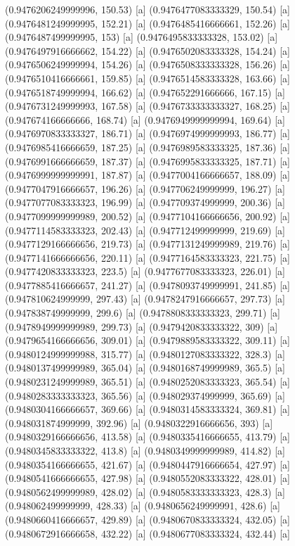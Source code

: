 {{{(0.9476206249999996, 150.53) [a] 
(0.9476477083333329, 150.54) [a] 
(0.9476481249999995, 152.21) [a] 
(0.9476485416666661, 152.26) [a] 
(0.9476487499999995, 153) [a] 
(0.9476495833333328, 153.02) [a] 
(0.9476497916666662, 154.22) [a] 
(0.9476502083333328, 154.24) [a] 
(0.9476506249999994, 154.26) [a] 
(0.9476508333333328, 156.26) [a] 
(0.9476510416666661, 159.85) [a] 
(0.9476514583333328, 163.66) [a] 
(0.9476518749999994, 166.62) [a] 
(0.947652291666666, 167.15) [a] 
(0.9476731249999993, 167.58) [a] 
(0.9476733333333327, 168.25) [a] 
(0.947674166666666, 168.74) [a] 
(0.9476949999999994, 169.64) [a] 
(0.9476970833333327, 186.71) [a] 
(0.9476974999999993, 186.77) [a] 
(0.9476985416666659, 187.25) [a] 
(0.9476989583333325, 187.36) [a] 
(0.9476991666666659, 187.37) [a] 
(0.9476995833333325, 187.71) [a] 
(0.9476999999999991, 187.87) [a] 
(0.9477004166666657, 188.09) [a] 
(0.9477047916666657, 196.26) [a] 
(0.947706249999999, 196.27) [a] 
(0.9477077083333323, 196.99) [a] 
(0.947709374999999, 200.36) [a] 
(0.9477099999999989, 200.52) [a] 
(0.9477104166666656, 200.92) [a] 
(0.9477114583333323, 202.43) [a] 
(0.947712499999999, 219.69) [a] 
(0.9477129166666656, 219.73) [a] 
(0.9477131249999989, 219.76) [a] 
(0.9477141666666656, 220.11) [a] 
(0.9477164583333323, 221.75) [a] 
(0.9477420833333323, 223.5) [a] 
(0.9477677083333323, 226.01) [a] 
(0.9477885416666657, 241.27) [a] 
(0.9478093749999991, 241.85) [a] 
(0.947810624999999, 297.43) [a] 
(0.9478247916666657, 297.73) [a] 
(0.947838749999999, 299.6) [a] 
(0.9478808333333323, 299.71) [a] 
(0.9478949999999989, 299.73) [a] 
(0.9479420833333322, 309) [a] 
(0.9479654166666656, 309.01) [a] 
(0.9479889583333322, 309.11) [a] 
(0.9480124999999988, 315.77) [a] 
(0.9480127083333322, 328.3) [a] 
(0.9480137499999989, 365.04) [a] 
(0.9480168749999989, 365.5) [a] 
(0.9480231249999989, 365.51) [a] 
(0.9480252083333323, 365.54) [a] 
(0.9480283333333323, 365.56) [a] 
(0.948029374999999, 365.69) [a] 
(0.9480304166666657, 369.66) [a] 
(0.9480314583333324, 369.81) [a] 
(0.948031874999999, 392.96) [a] 
(0.9480322916666656, 393) [a] 
(0.9480329166666656, 413.58) [a] 
(0.9480335416666655, 413.79) [a] 
(0.9480345833333322, 413.8) [a] 
(0.9480349999999989, 414.82) [a] 
(0.9480354166666655, 421.67) [a] 
(0.9480447916666654, 427.97) [a] 
(0.9480541666666655, 427.98) [a] 
(0.9480552083333322, 428.01) [a] 
(0.9480562499999989, 428.02) [a] 
(0.9480583333333323, 428.3) [a] 
(0.948062499999999, 428.33) [a] 
(0.9480656249999991, 428.6) [a] 
(0.9480660416666657, 429.89) [a] 
(0.9480670833333324, 432.05) [a] 
(0.9480672916666658, 432.22) [a] 
(0.9480677083333324, 432.44) [a] 
}}}
